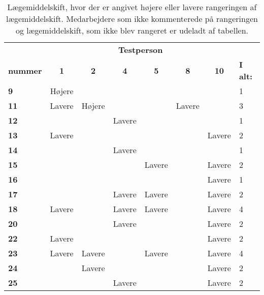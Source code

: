 \begin{table}[H]
\caption{Lægemiddelskift, hvor der er angivet højere eller lavere rangeringen af lægemiddelskift. Medarbejdere som ikke kommenterede på rangeringen og lægemiddelskift, som ikke blev rangeret er udeladt af tabellen.}
\vspace{2mm}
\label{table:resultat3}
\centering
\begin{tabular}{l|c|c|c|c|c|c|p{2cm}}
\rowcolor[HTML]{C0C0C0}{\textbf{Lægemiddel}}& \multicolumn{6}{c}{\textbf{Testperson}} &  \\
\rowcolor[HTML]{C0C0C0}\textbf{nummer}& \textbf{1} & \textbf{2} & \textbf{4} & \textbf{5} & \textbf{8} & \textbf{10}  & \textbf{I alt:}\\ \hline
\cellcolor[HTML]{C0C0C0}\textbf{9} & Højere & & & & &  & \cellcolor[HTML]{EFEFEF} 1 \\ \hline
\cellcolor[HTML]{C0C0C0}\textbf{11} & Lavere & Højere & & & Lavere &  & \cellcolor[HTML]{EFEFEF}3 \\\hline
\cellcolor[HTML]{C0C0C0}\textbf{12} & & & Lavere & & & & \cellcolor[HTML]{EFEFEF}1 \\\hline
\cellcolor[HTML]{C0C0C0}\textbf{13}& Lavere  & & & & & Lavere  & \cellcolor[HTML]{EFEFEF}2  \\ \hline
\cellcolor[HTML]{C0C0C0}\textbf{14} &  & & Lavere  & & &  & \cellcolor[HTML]{EFEFEF}1 \\ \hline
\cellcolor[HTML]{C0C0C0}\textbf{15} & & & & Lavere & & Lavere  & \cellcolor[HTML]{EFEFEF}2 \\\hline
\cellcolor[HTML]{C0C0C0}\textbf{16} & & & &  & & Lavere & \cellcolor[HTML]{EFEFEF}1 \\\hline
\cellcolor[HTML]{C0C0C0}\textbf{17}& & & Lavere & Lavere & & Lavere & \cellcolor[HTML]{EFEFEF}2 \\\hline
\cellcolor[HTML]{C0C0C0}\textbf{18} & Lavere & & Lavere & Lavere & & Lavere & \cellcolor[HTML]{EFEFEF}4 \\\hline
\cellcolor[HTML]{C0C0C0}\textbf{20} & & & Lavere &  & & Lavere & \cellcolor[HTML]{EFEFEF}2 \\\hline
\cellcolor[HTML]{C0C0C0}\textbf{22} & Lavere & &  &  & & Lavere & \cellcolor[HTML]{EFEFEF} 2\\\hline
\cellcolor[HTML]{C0C0C0}\textbf{23} & Lavere & Lavere & & Lavere & & Lavere  & \cellcolor[HTML]{EFEFEF} 4\\ \hline
\cellcolor[HTML]{C0C0C0}\textbf{24} & & Lavere & & & & Lavere & \cellcolor[HTML]{EFEFEF} 2 \\\hline
\cellcolor[HTML]{C0C0C0}\textbf{25} & & & Lavere & & & Lavere & \cellcolor[HTML]{EFEFEF} 2 \\\hline

\end{tabular}
\end{table}
